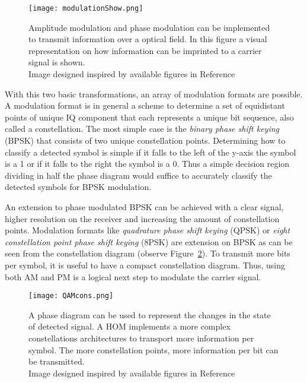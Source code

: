   \begin{figure}[h]
 \centering
 \texttt{[image: modulationShow.png]}
 \caption{Amplitude modulation and phase modulation can be implemented to transmit information over a optical field. In this figure a visual representation on how information can be imprinted to a carrier signal is shown.\\ {\scriptsize Image designed inspired by available figures in Reference~\cite{FundPhoto} } }
 \label{fig:AmPm}
 \end{figure}
 With this two basic transformations, an array of modulation formats are possible. A modulation format is in general a scheme to determine a set of equidistant points of unique IQ component that each represents a unique bit sequence, also called a constellation. The most simple case is the \textit{binary phase shift keying} (BPSK) that consists of two unique constellation points. Determining how to classify a detected symbol is simple if it falls to the left of the y-axis the symbol is a 1 or if it falls to the right the symbol is a 0. Thus a simple decision region dividing in half the phase diagram would suffice to accurately classify the detected symbols for BPSK modulation.
 
  An extension to phase modulated BPSK can be achieved with a clear signal, higher resolution on the receiver and increasing the amount of constellation points. Modulation formats like \textit{quadrature phase shift keying} (QPSK) or \textit{eight constellation point phase shift keying} (8PSK) are extension on BPSK as can be seen from the constellation diagram (observe Figure~\ref{fig:QAMcons}). To transmit more bits per symbol, it is useful to have a compact constellation diagram. Thus, using both AM and PM is a logical next step to modulate the carrier signal.
 
 \begin{figure}[h]
\centering
\texttt{[image: QAMcons.png]}
\caption{A phase diagram can be used to represent the changes in the state of detected signal. A HOM implements a more complex constellations architectures to transport more information per symbol. The more constellation points, more information per bit can be transmitted. \\ {\scriptsize Image designed inspired by available figures in Reference~\cite{khan2019optical}}     }
\label{fig:QAMcons}
\end{figure}

